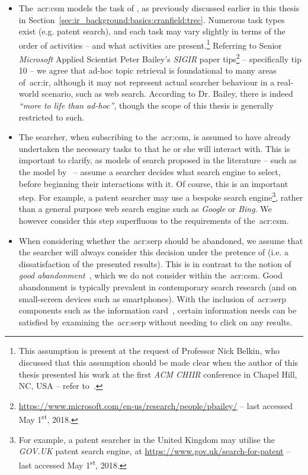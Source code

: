 \begin{itemize}
    
    \item{The~\gls{acr:csm} models the task of , as previously discussed earlier in this thesis in Section~\ref{sec:ir_background:basics:cranfield:trec}. Numerous task types exist (e.g. patent search), and each task may vary slightly in terms of the order of activities -- and what activities are present.\footnote{This assumption is present at the request of Professor Nick Belkin, who discussed that this assumption should be made clear when the author of this thesis presented his work at the first \emph{ACM CHIIR} conference in Chapel Hill, NC, USA -- refer to~\cite{maxwell2016dc}.} Referring to Senior \emph{Microsoft} Applied Scientist Peter Bailey's \emph{SIGIR} paper tips\footnote{\url{https://www.microsoft.com/en-us/research/people/pbailey/} -- last accessed May 1\textsuperscript{st}, 2018.} -- specifically tip 10 -- we agree that ad-hoc topic retrieval is foundational to many areas of~\gls{acr:ir}, although it may not represent actual searcher behaviour in a real-world scenario, such as web search. According to Dr. Bailey, there is indeed \emph{``more to life than ad-hoc''}, though the scope of this thesis is generally restricted to such.}
    
    \item{The searcher, when subscribing to the~\gls{acr:csm}, is assumed to have already undertaken the necessary tasks to  that he or she will interact with. This is important to clarify, as models of search proposed in the literature -- such as the model by~\cite{thomas2014modelling_behaviour} -- assume a searcher decides what search engine to select, before beginning their interactions with it. Of course, this is an important step. For example, a patent searcher may use a bespoke search engine\footnote{For example, a patent searcher in the United Kingdom may utilise the \emph{GOV.UK} patent search engine, at \url{https://www.gov.uk/search-for-patent} -- last accessed May 1\textsuperscript{st}, 2018.}, rather than a general purpose web search engine such as \emph{Google} or \emph{Bing}. We however consider this step superfluous to the requirements of the~\gls{acr:csm}.}
    
    \item{When considering whether the~\gls{acr:serp} should be abandoned, we assume that the searcher will always consider this decision under the pretence of  (i.e. a dissatisfaction of the presented results). This is in contrast to the notion of \emph{good abandonment}~\citep{khabsa2016good_abandonment}, which we do not consider within the~\gls{acr:csm}. Good abandonment is typically prevalent in contemporary search research (and on small-screen devices such as smartphones). With the inclusion of~\gls{acr:serp} components such as the information card~\citep{bota2016information_cards}, certain information needs can be satisfied by examining the~\gls{acr:serp} without needing to click on any results.}
    

\end{itemize}
